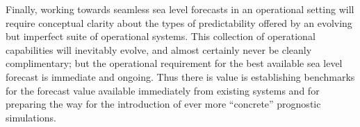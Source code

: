 Finally, working towards seamless sea level forecasts in an operational setting will require conceptual clarity about the types of predictability offered by an evolving but imperfect suite of operational systems. 
This collection of operational capabilities will inevitably evolve, and almost certainly never be cleanly complimentary; but the operational requirement for the best available sea level forecast is immediate and ongoing. 
Thus there is value is establishing benchmarks for the forecast value available immediately from existing systems and for preparing the way for the introduction of ever more ``concrete'' prognostic simulations.
